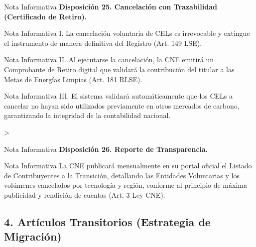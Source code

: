 \documentclass{cel}
\begin{document}
\vspace{0.2cm}
\begin{glowBox}[gobmxDorado]{Nota Informativa}
\textbf{Disposición 25. Cancelación con Trazabilidad (Certificado de Retiro).}
\end{glowBox}
\vspace{0.2cm}
\begin{glowBox}[gobmxDorado]{Nota Informativa}
I. La cancelación voluntaria de CELs es irrevocable y extingue el instrumento de manera definitiva del Registro (Art. 149 LSE).
\end{glowBox}
\vspace{0.2cm}
\begin{glowBox}[gobmxDorado]{Nota Informativa}
II. Al ejecutarse la cancelación, la CNE emitirá un \textquotedbl{}Comprobante de Retiro\textquotedbl{} digital que validará la contribución del titular a las Metas de Energías Limpias (Art. 181 RLSE).
\end{glowBox}
\vspace{0.2cm}
\begin{glowBox}[gobmxDorado]{Nota Informativa}
III. El sistema validará automáticamente que los CELs a cancelar no hayan sido utilizados previamente en otros mercados de carbono, garantizando la integridad de la contabilidad nacional.
\end{glowBox}
\textgreater{}

\vspace{0.2cm}
\begin{glowBox}[gobmxDorado]{Nota Informativa}
\textbf{Disposición 26. Reporte de Transparencia.}
\end{glowBox}
\vspace{0.2cm}
\begin{glowBox}[gobmxDorado]{Nota Informativa}
La CNE publicará mensualmente en su portal oficial el \textquotedbl{}Listado de Contribuyentes a la Transición\textquotedbl{}, detallando las Entidades Voluntarias y los volúmenes cancelados por tecnología y región, conforme al principio de máxima publicidad y rendición de cuentas (Art. 3 Ley CNE).
\end{glowBox}


\subsection{4. Artículos Transitorios (Estrategia de Migración)}
\nopagebreak
\end{document}
